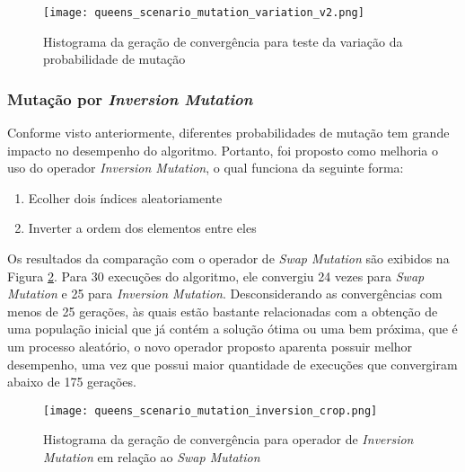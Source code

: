\documentclass[conference]{IEEEtran}
\begin{document}
\begin{figure}[h!]
	\centering
	\texttt{[image: queens\_scenario\_mutation\_variation\_v2.png]}
	\caption{Histograma da geração de convergência para teste da variação da probabilidade de mutação}
	\label{fig:queens_scenario_mutation_variation}
\end{figure}


\subsubsection{Mutação por \textit{Inversion Mutation}}

Conforme visto anteriormente, diferentes probabilidades de mutação tem grande impacto no desempenho do algoritmo. Portanto, foi proposto como melhoria o uso do operador \textit{Inversion Mutation}, o qual funciona da seguinte forma:
\begin{enumerate}
	\item Ecolher dois índices aleatoriamente
	\item Inverter a ordem dos elementos entre eles
\end{enumerate}

Os resultados da comparação com o operador de \textit{Swap Mutation} são exibidos na Figura \ref{fig:queens_scenario_mutation_inversion}. Para 30 execuções do algoritmo, ele convergiu 24 vezes para \textit{Swap Mutation} e 25 para \textit{Inversion Mutation}. Desconsiderando as convergências com menos de 25 gerações, às quais estão bastante relacionadas com a obtenção de uma população inicial que já contém a solução ótima ou uma bem próxima, que é um processo aleatório, o novo operador proposto aparenta possuir melhor desempenho, uma vez que possui maior quantidade de execuções que convergiram abaixo de 175 gerações. 

\begin{figure}[h!]
	\centering
	\texttt{[image: queens\_scenario\_mutation\_inversion\_crop.png]}
	\caption{Histograma da geração de convergência para operador de \textit{Inversion Mutation} em relação ao \textit{Swap Mutation}}
	\label{fig:queens_scenario_mutation_inversion}
\end{figure}
\end{document}
